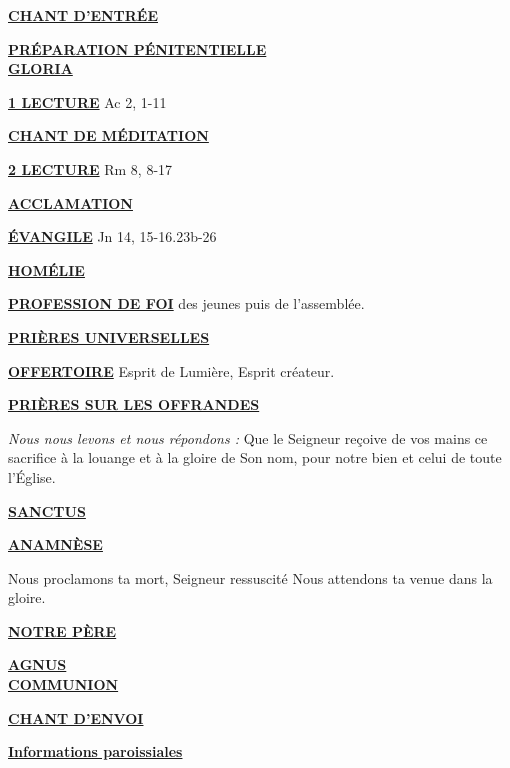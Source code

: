\documentclass[french,11pt,a4paper]{article}
\newcommand*{\chants}{../chants}
\newcommand*{\messe}{../messe_grace}
\newcommand*{\pu}{../pu}
\newcommand{\NewsItem}[1]{%
\vspace{3pt}
\underline{\textbf{#1}}
		  }
\begin{document}
\NewsItem{CHANT D'ENTRÉE}
	
\NewsItem{PRÉPARATION PÉNITENTIELLE} \\
	

\NewsItem{GLORIA}
	


\NewsItem{1\iere{} LECTURE} Ac 2, 1-11

\NewsItem{CHANT DE MÉDITATION}


\NewsItem{2\ieme{} LECTURE} Rm 8, 8-17

\NewsItem{ACCLAMATION}


\NewsItem{ÉVANGILE} Jn 14, 15-16.23b-26 

\NewsItem{HOMÉLIE}

\NewsItem{PROFESSION DE FOI} des jeunes puis de l'assemblée.


\NewsItem{PRIÈRES UNIVERSELLES} 


\NewsItem{OFFERTOIRE}  Esprit de Lumière, Esprit créateur.

\NewsItem{PRIÈRES SUR LES OFFRANDES}
\textit{Nous nous levons et nous répondons : }
Que le Seigneur reçoive de vos mains ce sacrifice à la louange et à la gloire 
de Son nom, pour notre bien et celui de toute l’Église.

\NewsItem{SANCTUS}


\NewsItem{ANAMNÈSE}
%
Nous proclamons ta mort, Seigneur ressuscité Nous attendons ta venue dans la gloire.

\NewsItem{NOTRE PÈRE}

\NewsItem{AGNUS} \\


\NewsItem{COMMUNION}


\newpage

\NewsItem{CHANT D'ENVOI}





\NewsItem{Informations paroissiales}
\end{document}
